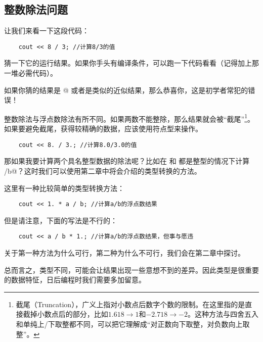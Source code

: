 \subsection*{整数除法问题}
让我们来看一下这段代码：
\begin{lstlisting}
    cout << 8 / 3; //计算8/3的值
\end{lstlisting}
猜一下它的运行结果。如果你手头有编译条件，可以跑一下代码看看（记得加上那一堆必需代码）。\par
如果你猜的结果是 @ 或者是类似的近似结果，那么恭喜你，这是初学者常犯的错误！\par
整数除法与浮点数除法有所不同。如果两数不能整除，那么结果就会被``截尾''\footnote{截尾（Truncation），广义上指对小数点后数字个数的限制。在这里指的是直接截掉小数点后的部分，比如$1.618\rightarrow1$和$-2.718\rightarrow-2$。这种方法与四舍五入和单纯上/下取整都不同，可以把它理解成``对正数向下取整，对负数向上取整''。}。如果要避免截尾，获得较精确的数据，应该使用符点型来操作。
\begin{lstlisting}
    cout << 8. / 3.; //计算8.0/3.0的值
\end{lstlisting}\par
那如果我要计算两个具名整型数据的除法呢？比如在 \lstinline@a@ 和 \lstinline@b@ 都是整型的情况下计算 \lstinline@a/b@？这时我们可以使用第二章中将会介绍的类型转换的方法。\par
这里有一种比较简单的类型转换方法：
\begin{lstlisting}
    cout << 1. * a / b; //计算a/b的浮点数结果
\end{lstlisting}
但是请注意，下面的写法是不行的：
\begin{lstlisting}
    cout << a / b * 1.; //计算a/b的浮点数结果，但事与愿违
\end{lstlisting}
关于第一种方法为什么可行，第二种为什么不可行，我们会在第二章中探讨。\par
总而言之，类型不同，可能会让结果出现一些意想不到的差异。因此类型是很重要的数据特怔，日后编程时我们需要多加留意。\par
